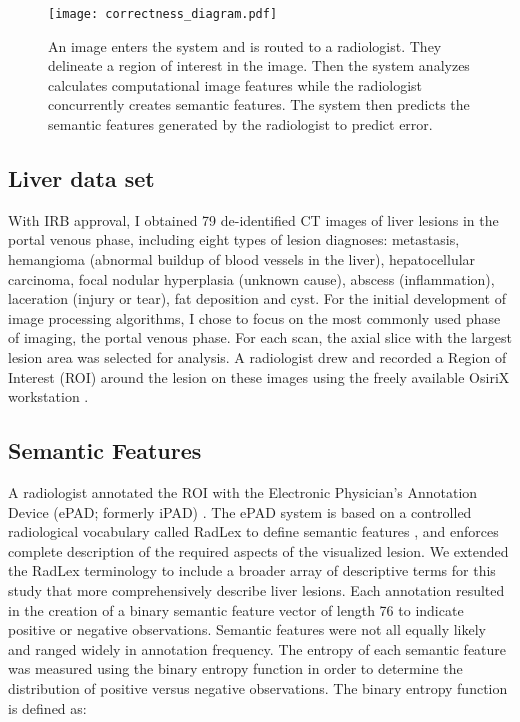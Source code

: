 \begin{figure}[h]
	\centering
	\texttt{[image: correctness\_diagram.pdf]}
	\caption[Overview of the the annotation verification system]{An image enters the system and is routed to a radiologist. They delineate a region of interest in the image. Then the system analyzes calculates computational image features while the radiologist concurrently creates semantic features. The system then predicts the semantic features generated by the radiologist to predict error.}
	\label{fig:correctness_diagram}
\end{figure}

\subsection{Liver data set}
With IRB approval, I obtained 79 de-identified CT images of liver lesions in the portal venous phase, including eight types of lesion diagnoses: metastasis, hemangioma (abnormal buildup of blood vessels in the liver), hepatocellular carcinoma, focal nodular hyperplasia (unknown cause), abscess (inflammation), laceration (injury or tear), fat deposition and cyst. For the initial development of image processing algorithms, I chose to focus on the most commonly used phase of imaging, the portal venous phase. For each scan, the axial slice with the largest lesion area was selected for analysis. A radiologist drew and recorded a Region of Interest (ROI) around the lesion on these images using the freely available OsiriX workstation \cite{Armato:2007ks,Rosset:2004kk}.


\subsection{Semantic Features}
A radiologist annotated the ROI with the Electronic Physician's Annotation Device (ePAD; formerly iPAD) \cite{Napel:2010es, Rubin:2008uz}. The ePAD system is based on a controlled radiological vocabulary called RadLex to define semantic features \cite{Korenblum:2011gx, Langlotz:2006jn}, and enforces complete description of the required aspects of the visualized lesion. We extended the RadLex terminology to include a broader array of descriptive terms for this study that more comprehensively describe liver lesions. Each annotation resulted in the creation of a binary semantic feature vector of length 76 to indicate positive or negative observations.
Semantic features were not all equally likely and ranged widely in annotation frequency. The entropy of each semantic feature was measured using the binary entropy function in order to determine the distribution of positive versus negative observations. The binary entropy function is defined as:

